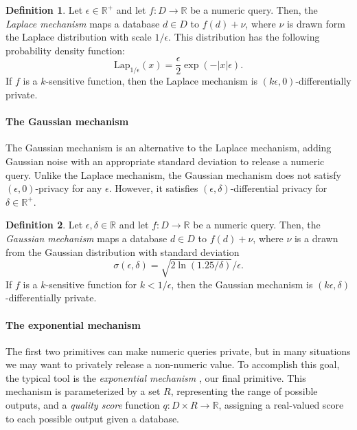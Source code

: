 \documentclass{sig-alternate-05-2015}
\theoremstyle{plain}
\theoremstyle{definition}
\newtheorem{definition}{Definition}[section]
\theoremstyle{corollary}
\def\R{\mathbb{R}}
\newcommand{\rplus}{\R^+}
\begin{document}
\begin{definition}
  Let $\epsilon \in \rplus$ and let $f : D \to \mathbb{R}$ be a numeric
  query. Then, the \emph{Laplace mechanism} maps a database $d \in D$ to $f(d) +
  \nu$, where $\nu$ is drawn form the Laplace distribution with scale
  ${1/\epsilon}$. This distribution has the following probability density
  function:
  \[
    \text{Lap}_{1/\epsilon}(x) = \frac{\epsilon}{2} \exp( - |x| \epsilon ) .
  \]
  If $f$ is a $k$-sensitive function, then the Laplace mechanism is $(k\epsilon,
  0)$-differentially private.
\end{definition}

\paragraph*{The Gaussian mechanism}

The Gaussian mechanism is an alternative to the Laplace mechanism, adding
Gaussian noise with an appropriate standard deviation to release a numeric
query. Unlike the Laplace mechanism, the Gaussian mechanism does not satisfy
$(\epsilon, 0)$-privacy for any $\epsilon$. However, it satisfies $(\epsilon,
\delta)$-differential privacy for $\delta \in \rplus$.

\begin{definition}
\label{def:gaussMech}
  Let $\epsilon, \delta \in \mathbb{R}$ and let $f : D \to
  \mathbb{R}$ be a numeric query. Then, the \emph{Gaussian mechanism} maps a
  database $d \in D$ to $f(d) + \nu$, where $\nu$ is a drawn from the Gaussian
  distribution with standard deviation
  \[
    \sigma(\epsilon, \delta) = \sqrt{2 \ln(1.25/\delta)}/\epsilon .
  \]
  If $f$ is a $k$-sensitive function for $k < 1/\epsilon$, then the Gaussian
  mechanism is $(k\epsilon, \delta)$-differentially private.
\end{definition}

\paragraph*{The exponential mechanism}

The first two primitives can make numeric queries private, but in many
situations we may want to privately release a non-numeric value. To accomplish
this goal, the typical tool is the \emph{exponential mechanism} \citep{MT07},
our final primitive. This mechanism is parameterized by a set $R$, representing
the range of possible outputs, and a \emph{quality score} function $q : D \times
R \to \mathbb{R}$, assigning a real-valued score to each possible output given a
database.
\end{document}

